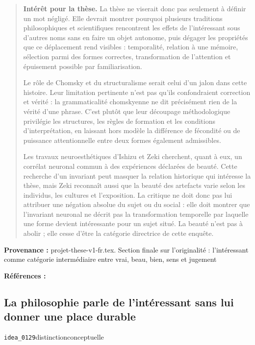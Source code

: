 \documentclass[10pt,a4paper]{article}
\begin{document}
\begin{quote}
\textbf{Intérêt pour la thèse.} La thèse ne viserait donc pas seulement à définir un mot négligé. Elle devrait montrer pourquoi plusieurs traditions philosophiques et scientifiques rencontrent les effets de l'intéressant sous d'autres noms sans en faire un objet autonome, puis dégager les propriétés que ce déplacement rend visibles : temporalité, relation à une mémoire, sélection parmi des formes correctes, transformation de l'attention et épuisement possible par familiarisation.

Le rôle de Chomsky et du structuralisme serait celui d'un jalon dans cette histoire. Leur limitation pertinente n'est pas qu'ils confondraient correction et vérité : la grammaticalité chomskyenne ne dit précisément rien de la vérité d'une phrase. C'est plutôt que leur découpage méthodologique privilégie les structures, les règles de formation et les conditions d'interprétation, en laissant hors modèle la différence de fécondité ou de puissance attentionnelle entre deux formes également admissibles.

Les travaux neuroesthétiques d'Ishizu et Zeki cherchent, quant à eux, un corrélat neuronal commun à des expériences déclarées de beauté. Cette recherche d'un invariant peut masquer la relation historique qui intéresse la thèse, mais Zeki reconnaît aussi que la beauté des artefacts varie selon les individus, les cultures et l'exposition. La critique ne doit donc pas lui attribuer une négation absolue du sujet ou du social : elle doit montrer que l'invariant neuronal ne décrit pas la transformation temporelle par laquelle une forme devient intéressante pour un sujet situé. La beauté n'est pas à abolir ; elle cesse d'être la catégorie directrice de cette enquête.
\end{quote}
{\footnotesize\color{metadata}\textbf{Provenance :} projet-these-v1-fr.tex. Section finale sur l'originalité : l'intéressant comme catégorie intermédiaire entre vrai, beau, bien, sens et jugement\par}
{\footnotesize\color{metadata}\textbf{Références :} \parencite{chomsky1957syntactic,ishizu2011brainbeauty,zeki2018mathematicalbeauty}\par}

\subsection{La philosophie parle de l'intéressant sans lui donner une place durable}
{\small\color{metadata} \texttt{idea\_0129}\quad\textbullet\quad distinction\quad\textbullet\quad conceptuelle\par}
\end{document}
